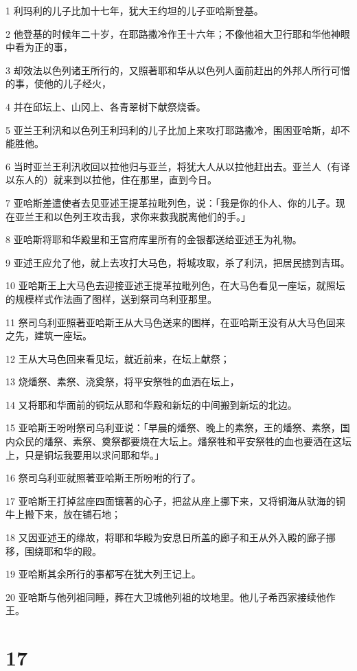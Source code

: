 \par 1 利玛利的儿子比加十七年，犹大王约坦的儿子亚哈斯登基。
\par 2 他登基的时候年二十岁，在耶路撒冷作王十六年；不像他祖大卫行耶和华他神眼中看为正的事，
\par 3 却效法以色列诸王所行的，又照著耶和华从以色列人面前赶出的外邦人所行可憎的事，使他的儿子经火，
\par 4 并在邱坛上、山冈上、各青翠树下献祭烧香。
\par 5 亚兰王利汛和以色列王利玛利的儿子比加上来攻打耶路撒冷，围困亚哈斯，却不能胜他。
\par 6 当时亚兰王利汛收回以拉他归与亚兰，将犹大人从以拉他赶出去。亚兰人（有译以东人的）就来到以拉他，住在那里，直到今日。
\par 7 亚哈斯差遣使者去见亚述王提革拉毗列色，说：「我是你的仆人、你的儿子。现在亚兰王和以色列王攻击我，求你来救我脱离他们的手。」
\par 8 亚哈斯将耶和华殿里和王宫府库里所有的金银都送给亚述王为礼物。
\par 9 亚述王应允了他，就上去攻打大马色，将城攻取，杀了利汛，把居民掳到吉珥。
\par 10 亚哈斯王上大马色去迎接亚述王提革拉毗列色，在大马色看见一座坛，就照坛的规模样式作法画了图样，送到祭司乌利亚那里。
\par 11 祭司乌利亚照著亚哈斯王从大马色送来的图样，在亚哈斯王没有从大马色回来之先，建筑一座坛。
\par 12 王从大马色回来看见坛，就近前来，在坛上献祭；
\par 13 烧燔祭、素祭、浇奠祭，将平安祭牲的血洒在坛上，
\par 14 又将耶和华面前的铜坛从耶和华殿和新坛的中间搬到新坛的北边。
\par 15 亚哈斯王吩咐祭司乌利亚说：「早晨的燔祭、晚上的素祭，王的燔祭、素祭，国内众民的燔祭、素祭、奠祭都要烧在大坛上。燔祭牲和平安祭牲的血也要洒在这坛上，只是铜坛我要用以求问耶和华。」
\par 16 祭司乌利亚就照著亚哈斯王所吩咐的行了。
\par 17 亚哈斯王打掉盆座四面镶著的心子，把盆从座上挪下来，又将铜海从驮海的铜牛上搬下来，放在铺石地；
\par 18 又因亚述王的缘故，将耶和华殿为安息日所盖的廊子和王从外入殿的廊子挪移，围绕耶和华的殿。
\par 19 亚哈斯其余所行的事都写在犹大列王记上。
\par 20 亚哈斯与他列祖同睡，葬在大卫城他列祖的坟地里。他儿子希西家接续他作王。

\chapter{17}

